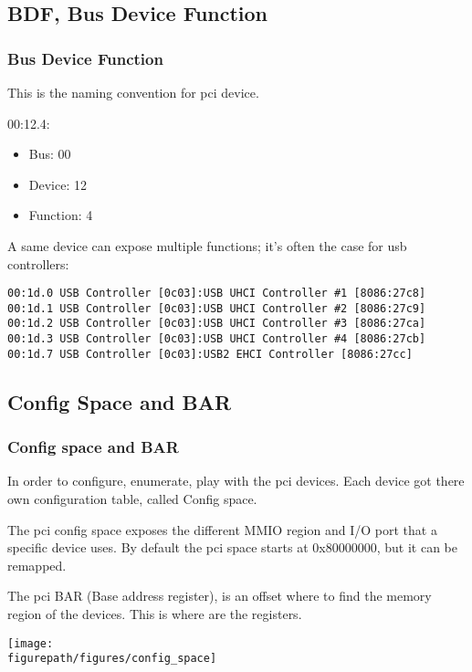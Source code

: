 \subsection{BDF, Bus Device Function}
\begin{frame}[fragile]
\frametitle{Bus Device Function}
This is the naming convention for pci device.

\-

00:12.4:
\begin{itemize}
\item Bus: 00
\item Device: 12
\item Function: 4
\end{itemize}

\-

A same device can expose multiple functions; it's often the case for usb controllers:

\begin{verbatim}
00:1d.0 USB Controller [0c03]:USB UHCI Controller #1 [8086:27c8]
00:1d.1 USB Controller [0c03]:USB UHCI Controller #2 [8086:27c9]
00:1d.2 USB Controller [0c03]:USB UHCI Controller #3 [8086:27ca]
00:1d.3 USB Controller [0c03]:USB UHCI Controller #4 [8086:27cb]
00:1d.7 USB Controller [0c03]:USB2 EHCI Controller [8086:27cc]
\end{verbatim}

\end{frame}

\subsection{Config Space and BAR}
\begin{frame}
\frametitle{Config space and BAR}
In order to configure, enumerate, play with the pci devices. Each device got
there own configuration table, called Config space.

\-

The pci config space exposes the different MMIO region and I/O port that a specific device uses. By default the pci space starts at 0x80000000, but it can be remapped.

\-

The pci BAR (Base address register), is an offset where to find the memory region of the devices. This is where are the registers.

\end{frame}

\begin{frame}
\begin{center}
\texttt{[image: \\figurepath/figures/config\_space]}
\end{center}
\end{frame}

